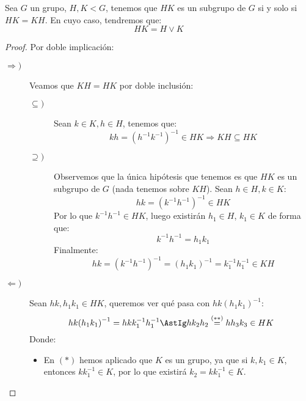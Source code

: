 \begin{prop}\label{prop:hk_kh}
    Sea $G$ un grupo, $H, K < G$, tenemos que $HK$ es un subgrupo de $G$ si y solo si $HK = KH$. En cuyo caso, tendremos que:
    \begin{equation*}
        HK = H\lor K
    \end{equation*}
    \begin{proof}
        Por doble implicación:
        \begin{description}
            \item [$\Longrightarrow)$]   Veamos que $KH = HK$ por doble inclusión:
                \begin{description}
                    \item [$\subseteq)$] Sean $k\in K, h\in H$, tenemos que:
                        \begin{equation*}
                            kh = {(h^{-1}k^{-1})}^{-1} \in HK \Longrightarrow KH \subseteq HK
                        \end{equation*}
                    \item [$\supseteq)$] Observemos que la única hipótesis que tenemos es que $HK$ es un subgrupo de $G$ (nada tenemos sobre $KH$). Sean $h\in H, k\in K$:
                        \begin{equation*}
                            hk = {(k^{-1}h^{-1})}^{-1} \in HK
                        \end{equation*}
                        Por lo que $k^{-1}h^{-1}\in HK$, luego existirán $h_1\in H$, $k_1\in K$ de forma que:
                        \begin{equation*}
                            k^{-1}h^{-1} = h_1k_1
                        \end{equation*}
                        Finalmente:
                        \begin{equation*}
                            hk = {(k^{-1}h^{-1})}^{-1} = {(h_1k_1)}^{-1} = k_1^{-1}h_1^{-1}\in KH
                        \end{equation*}
                \end{description}

            \item [$\Longleftarrow)$] Sean $ hk, h_1k_1 \in HK$, queremos ver qué pasa con $hk{(h_1k_1)}^{-1}$:
                \begin{equation*}
                    hk{(h_1k_1)}^{-1} = h k k_1^{-1} h_1^{-1} \AstIg h k_2 h_2 \stackrel{(\ast\ast)}{=} hh_3k_3 \in HK
                \end{equation*}
                Donde:
                \begin{itemize}
                    \item En $(\ast)$ hemos aplicado que $K$ es un grupo, ya que si $k,k_1\in K$, entonces $kk_1^{-1}\in K$, por lo que existirá $k_2 = kk_1^{-1} \in K$.


\end{itemize}
\end{description}
\end{proof}
\end{prop}
